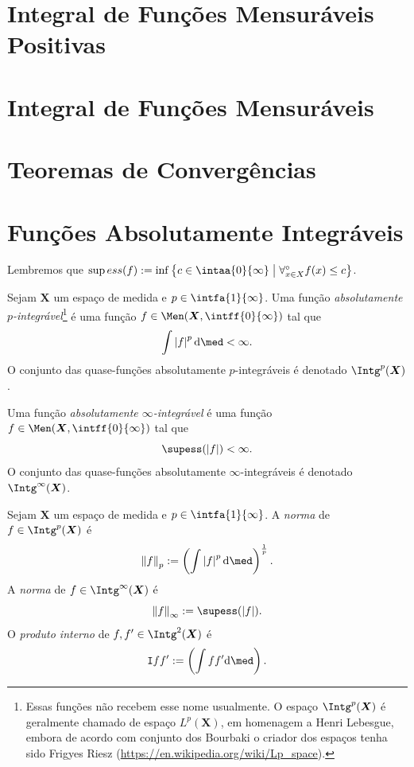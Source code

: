 \section{Integral de Funções Mensuráveis Positivas}

\section{Integral de Funções Mensuráveis}

\section{Teoremas de Convergências}

\section{Funções Absolutamente Integráveis}

Lembremos que $\sup ess (f) := \inf \set{c \in \intaa{0}{\infty}}{\forall^\circ_{x \in X} f(x) \leq c}$.

\begin{defi}
Sejam $\bm X$ um espaço de medida e $p \in \intfa{1}{\infty}$. Uma função \emph{absolutamente $p$-integrável}\footnote{Essas funções não recebem esse nome usualmente. O espaço $\Intg^p(\bm X)$ é geralmente chamado de espaço $L^p(\bm X)$, em homenagem a Henri Lebesgue, embora de acordo com conjunto dos Bourbaki o criador dos espaços tenha sido Frigyes Riesz (\url{https://en.wikipedia.org/wiki/Lp_space}).} é uma função $f \in \Men(\bm X,\intff{0}{\infty})$ tal que
	\begin{equation*}
	\int \abs{f}^p \dd\med < \infty.
	\end{equation*}
O conjunto das quase-funções absolutamente $p$-integráveis é denotado $\Intg^p(\bm X)$.

Uma função \emph{absolutamente $\infty$-integrável} é uma função $f \in \Men(\bm X,\intff{0}{\infty})$ tal que
	\begin{equation*}
	\supess(\abs{f}) < \infty.
	\end{equation*}
O conjunto das quase-funções absolutamente $\infty$-integráveis é denotado $\Intg^\infty(\bm X)$.
\end{defi}

\begin{defi}
Sejam $\bm X$ um espaço de medida e $p \in \intfa{1}{\infty}$.  A \emph{norma} de $f \in \Intg^p(\bm X)$ é
	\begin{equation*}
	\nor{f}_p := \left( \int \abs{f}^p \dd\med \right)^{\frac{1}{p}}.
	\end{equation*}
A \emph{norma} de $f \in \Intg^\infty(\bm X)$ é
	\begin{equation*}
	\nor{f}_\infty := \supess(\abs{f}).
	\end{equation*}
O \emph{produto interno} de $f,f' \in \Intg^2(\bm X)$ é
	\begin{equation*}
	\inte{f}{f'} := \left( \int ff' \dd\med \right).
	\end{equation*}
\end{defi}

